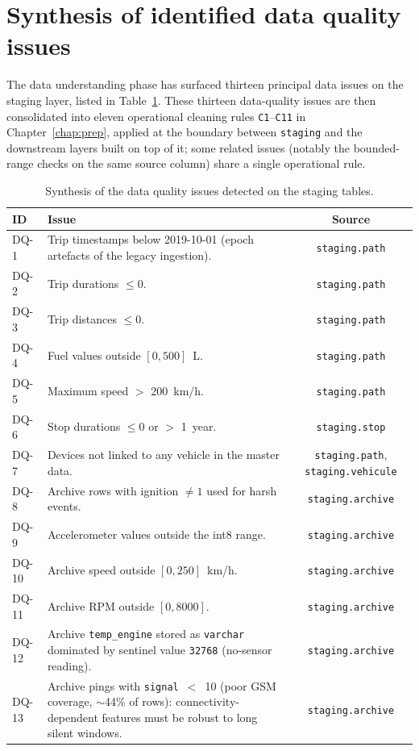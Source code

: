 \section{Synthesis of identified data quality issues}
\label{sec:dq-issues}
The data understanding phase has surfaced thirteen principal data issues on the staging layer, listed in Table~\ref{tab:issues}. These thirteen data-quality issues are then consolidated into eleven operational cleaning rules \texttt{C1}--\texttt{C11} in Chapter~\ref{chap:prep}, applied at the boundary between \texttt{staging} and the downstream layers built on top of it; some related issues (notably the bounded-range checks on the same source column) share a single operational rule.

\begin{table}[h]
\centering
\caption{Synthesis of the data quality issues detected on the staging tables.}
\label{tab:issues}
\begin{tabular}{|l|p{8cm}|c|}
\hline
\textbf{ID} & \textbf{Issue} & \textbf{Source} \\
\hline
DQ-1  & Trip timestamps below 2019-10-01 (epoch artefacts of the legacy ingestion). & \texttt{staging.path} \\
DQ-2  & Trip durations $\le 0$. & \texttt{staging.path} \\
DQ-3  & Trip distances $\le 0$. & \texttt{staging.path} \\
DQ-4  & Fuel values outside $[0, 500]$~L. & \texttt{staging.path} \\
DQ-5  & Maximum speed $>$ 200~km/h. & \texttt{staging.path} \\
DQ-6  & Stop durations $\le 0$ or $>$ 1~year. & \texttt{staging.stop} \\
DQ-7  & Devices not linked to any vehicle in the master data. & \texttt{staging.path}, \texttt{staging.vehicule} \\
DQ-8  & Archive rows with ignition $\ne 1$ used for harsh events. & \texttt{staging.archive} \\
DQ-9  & Accelerometer values outside the int8 range. & \texttt{staging.archive} \\
DQ-10 & Archive speed outside $[0, 250]$~km/h. & \texttt{staging.archive} \\
DQ-11 & Archive RPM outside $[0, 8000]$. & \texttt{staging.archive} \\
DQ-12 & Archive \texttt{temp\_engine} stored as \texttt{varchar} dominated by sentinel value \texttt{32768} (no-sensor reading). & \texttt{staging.archive} \\
DQ-13 & Archive pings with \texttt{signal}~$<$~10 (poor GSM coverage, $\sim$44\% of rows): connectivity-dependent features must be robust to long silent windows. & \texttt{staging.archive} \\
\hline
\end{tabular}
\end{table}

